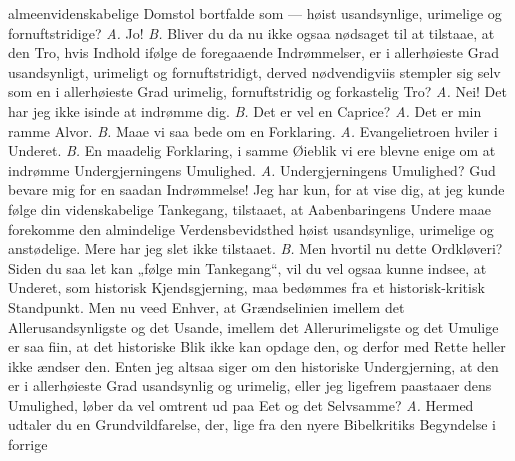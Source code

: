 \documentclass[12pt,a4paper]{book}
\begin{document}
almeenvidenskabelige Domstol bortfalde som --- høist usandsynlige, urimelige og
fornuftstridige? \textit{A.} Jo! \textit{B.} Bliver du da nu ikke ogsaa nødsaget
til at tilstaae, at den Tro, hvis Indhold ifølge de foregaaende Indrømmelser, er
i allerhøieste Grad usandsynligt, urimeligt og fornuftstridigt, derved
nødvendigviis stempler sig selv som en i allerhøieste Grad urimelig,
fornuftstridig og forkastelig Tro? \textit{A.} Nei! Det har jeg ikke isinde at
indrømme dig. \textit{B.} Det er vel en Caprice? \textit{A.} Det er min ramme
Alvor. \textit{B.} Maae vi saa bede om en Forklaring.
\textit{A.} Evangelietroen hviler i Underet. \textit{B.} En maadelig Forklaring,
i samme Øieblik vi ere blevne enige om at indrømme Undergjerningens Umulighed.
\textit{A.} Undergjerningens Umulighed? Gud bevare mig for en saadan
Indrømmelse! Jeg har kun, for at vise dig, at jeg kunde følge din videnskabelige
Tankegang, tilstaaet, at Aabenbaringens Undere maae forekomme den almindelige
Verdensbevidsthed høist usandsynlige, urimelige og anstødelige. Mere har jeg
slet ikke tilstaaet. \textit{B.} Men hvortil nu dette Ordkløveri? Siden du saa
let kan „følge min Tankegang“, vil du vel ogsaa kunne indsee, at Underet, som
historisk Kjendsgjerning, maa bedømmes fra et historisk-kritisk Standpunkt. Men
nu veed Enhver, at Grændselinien imellem det Allerusandsynligste og det Usande,
imellem det Allerurimeligste og det Umulige er saa fiin, at det historiske Blik
ikke kan opdage den, og derfor med Rette heller ikke ændser den. Enten jeg
altsaa siger om den historiske Undergjerning, at den er i allerhøieste Grad
usandsynlig og urimelig, eller jeg ligefrem paastaaer dens Umulighed, løber da
vel omtrent ud paa Eet og det Selvsamme? \textit{A.} Hermed udtaler du en
Grundvildfarelse, der, lige fra den nyere Bibelkritiks Begyndelse i forrige
\end{document}
